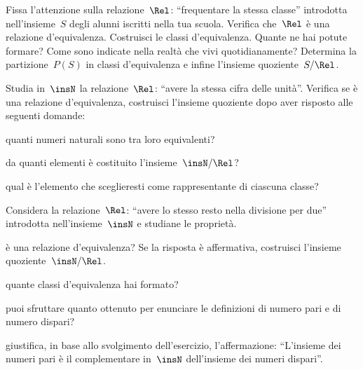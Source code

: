 \begin{multicols}{2}
\begin{esercizio}
\label{ese:\thechapter.27}
Fissa l'attenzione sulla relazione~$\Rel$: ``frequentare la stessa classe'' introdotta nell'insieme~$S$ degli alunni iscritti nella tua scuola.
Verifica che~$\Rel$ è una relazione d'equivalenza. Costruisci le classi d'equivalenza. Quante ne hai potute formare? Come sono indicate nella
realtà che vivi quotidianamente? Determina la partizione~$P(S)$ in classi d'equivalenza e infine l'insieme quoziente~$S/\Rel$.
\end{esercizio}

\begin{esercizio}
\label{ese:\thechapter.28}
Studia in~$\insN$ la relazione~$\Rel$: ``avere la stessa cifra delle unità''. Verifica se è una relazione
d'equivalenza, costruisci l'insieme quoziente dopo aver risposto alle seguenti domande:\vspace{-1ex}
\begin{itemize*}
\item quanti numeri naturali sono tra loro equivalenti?
\item da quanti elementi è costituito l'insieme~$\insN/\Rel$?
\item qual è l'elemento che sceglieresti come rappresentante di ciascuna classe?
\end{itemize*}
\end{esercizio}

\begin{esercizio}
\label{ese:\thechapter.29}
Considera la relazione~$\Rel$: ``avere lo stesso resto nella divisione per due'' introdotta nell'insieme~$\insN$ e studiane le proprietà.
\begin{itemize*}
\item è una relazione d'equivalenza? Se la risposta è affermativa, costruisci l'insieme quoziente~$\insN/\Rel$.
\item quante classi d'equivalenza hai formato?
\item puoi sfruttare quanto ottenuto per enunciare le definizioni di numero pari e di numero dispari?
\item giustifica, in base allo svolgimento dell'esercizio, l'affermazione: ``L'insieme dei numeri pari è il
complementare in~$\insN$ dell'insieme dei numeri dispari''.
\end{itemize*}
\end{esercizio}


\end{multicols}
